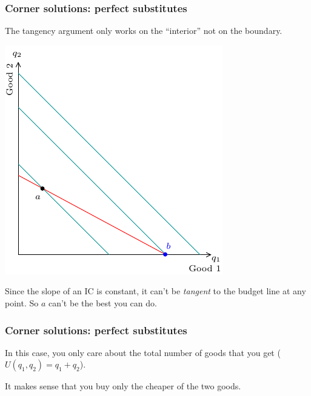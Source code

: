 \documentclass[xcolor=pdftex,dvipsnames]{beamer}
\begin{document}
\begin{frame}
\frametitle{Corner solutions: perfect substitutes}
The tangency argument only works on the ``interior'' not on the boundary.
\begin{center}
\includegraphics[scale=0.8]{pics/CornerSol}
\end{center}
Since the slope of an IC is constant, it can't be \emph{tangent} to
the budget line at any point. So $a$ can't be the best you can do.
\medskip



\end{frame}
\begin{frame}
\frametitle{Corner solutions: perfect substitutes}
In this case, you only care about the total number of goods that you
get ($U(q_1,q_2) = q_1+q_2$).

It makes sense that you buy only the cheaper of the two goods.


\end{frame}
\end{document}

